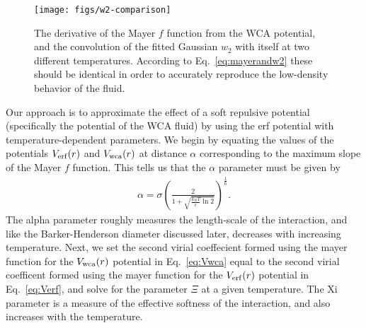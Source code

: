 \documentclass[letterpaper,twocolumn,amsmath,amssymb,prb]{revtex4-1}
\begin{document}

\begin{figure}
\begin{center}
\texttt{[image: figs/w2-comparison]}
\end{center}
\caption{The derivative of the Mayer $f$ function from the WCA
  potential, and the convolution of the fitted Gaussian $w_2$ with
  itself at two different temperatures.  According to
  Eq.~\ref{eq:mayerandw2} these should be identical in order to
  accurately reproduce the low-density behavior of the fluid.}
\label{fig:w2-comparison}
\end{figure}

Our approach is to approximate the effect of a soft repulsive potential
(specifically the potential of the WCA fluid) by using the erf
potential with temperature-dependent parameters. 
We begin by equating the values of the potentials $V_{\mathrm{erf}}(r)$ and $V_{\mathrm{wca}}(r)$ at distance
$\alpha$ corresponding to
the maximum slope of the Mayer $f$ function. This tells us that the $\alpha$ parameter must be given by
\begin{align}
  \alpha = \sigma \left( \frac{2}{1 + \sqrt{\frac{k_BT}{\epsilon}
        \ln 2}} \right)^{\frac{1}{6}}.
\end{align}
The alpha parameter roughly measures the length-scale of the
interaction, and like the Barker-Henderson diameter discussed later, decreases with
increasing temperature.  Next, we set the second virial coeffecient formed using 
the mayer function for the $V_{\mathrm{wca}}(r)$ potential in Eq.~\ref{eq:Vwca} equal to the second virial coefficent formed using the mayer function for the $V_{\mathrm{erf}}(r)$ potential in Eq.~\ref{eq:Verf}, and solve for the parameter $\Xi$ at a given temperature.
The Xi parameter is a measure of the effective softness of the interaction, and
also increases with the temperature.  
\end{document}
